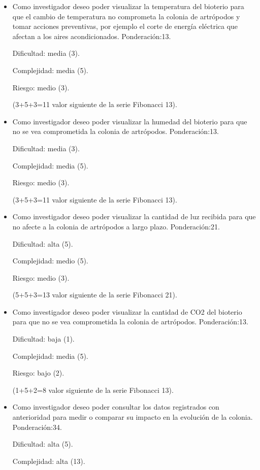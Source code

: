 \documentclass[
11pt, %
]{charter}
\begin{document}
\begin{itemize}
	\item Como investigador deseo poder visualizar la temperatura del bioterio para que el cambio de temperatura no comprometa la colonia de artrópodos y tomar acciones preventivas, por ejemplo el corte de energía eléctrica que afectan a los aires acondicionados.		
	Ponderación:13.
	
	Dificultad: media (3).
	
	Complejidad: media (5).
	
	Riesgo: medio (3).
	
	(3+5+3=11 valor siguiente de la serie Fibonacci 13).

	\item Como investigador deseo poder visualizar la humedad del bioterio para que no se vea comprometida la colonia de artrópodos.
	Ponderación:13.
	
	Dificultad: media (3).
	
	Complejidad: media (5).
	
	Riesgo: medio (3).
	
	(3+5+3=11 valor siguiente de la serie Fibonacci 13).
	
	\item Como investigador deseo poder visualizar la cantidad de luz recibida para  que no afecte a la colonia de artrópodos a largo plazo.
	Ponderación:21.
	
	Dificultad: alta (5).
	
	Complejidad: medio (5).
	
	Riesgo: medio (3).
	
	(5+5+3=13 valor siguiente de la serie Fibonacci 21).
	
	\item Como investigador deseo poder visualizar la cantidad de CO2 del bioterio para que no se vea comprometida la colonia de artrópodos.
	Ponderación:13.
	
	Dificultad: baja (1).
	
	Complejidad: media (5).
	
	Riesgo: bajo (2).
	
	(1+5+2=8 valor siguiente de la serie Fibonacci 13).
	
	\item Como investigador deseo poder consultar los datos registrados con anterioridad para medir o comparar su impacto en la evolución de la colonia.
	Ponderación:34.
	
	Dificultad: alta (5).
	
	Complejidad: alta (13).
	

\end{itemize}
\end{document}
